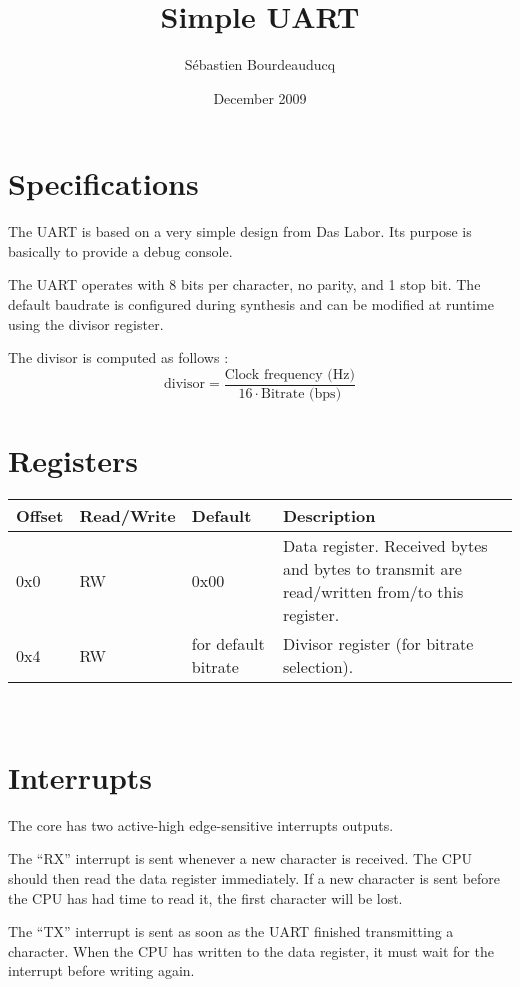 \documentclass[a4paper,11pt]{article}
\title{Simple UART}
\author{S\'ebastien Bourdeauducq}
\date{December 2009}
\begin{document}
\setlength{\parindent}{0pt}
\setlength{\parskip}{5pt}
\maketitle{}
\section{Specifications}
The UART is based on a very simple design from Das Labor. Its purpose is basically to provide a debug console.

The UART operates with 8 bits per character, no parity, and 1 stop bit. The default baudrate is configured during synthesis and can be modified at runtime using the divisor register.

The divisor is computed as follows :
\begin{equation*}
\text{divisor} = \frac{\text{Clock frequency (Hz)}}{16 \cdot \text{Bitrate (bps)}}
\end{equation*}

\section{Registers}
\begin{tabularx}{\textwidth}{|l|l|l|X|}
\hline
\bf{Offset} & \bf{Read/Write} & \bf{Default} & \bf{Description} \\
\hline
0x0 & RW & 0x00 & Data register. Received bytes and bytes to transmit are read/written from/to this register. \\
\hline
0x4 & RW & for default bitrate & Divisor register (for bitrate selection). \\
\hline
\end{tabularx}\\

\section{Interrupts}
The core has two active-high edge-sensitive interrupts outputs.

The ``RX'' interrupt is sent whenever a new character is received. The CPU should then read the data register immediately. If a new character is sent before the CPU has had time to read it, the first character will be lost.

The ``TX'' interrupt is sent as soon as the UART finished transmitting a character. When the CPU has written to the data register, it must wait for the interrupt before writing again.
\end{document}
